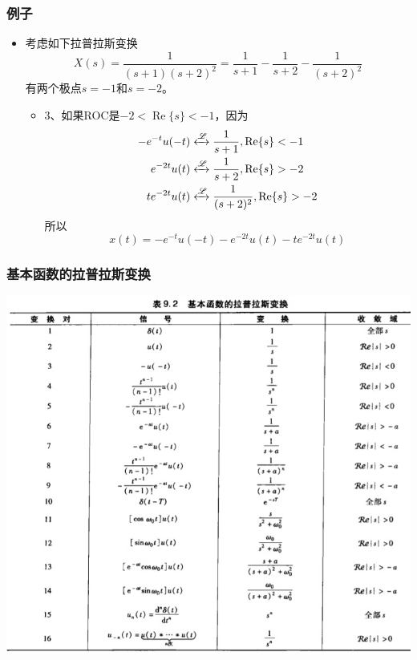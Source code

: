 \documentclass[CJKutf8,dvipsnames,table]{beamer}
\begin{document}
\begin{CJK*}{UTF8}{song}
  \begin{frame}
    \frametitle{例子}
    \begin{itemize}
    \item 考虑如下拉普拉斯变换
	\[
	   	X(s)  = \frac{1}{(s+1)(s+2)^2} = \frac{1}{s+1} - \frac{1}{s+2} - \frac{1}{(s+2)^2}
	\]
	有两个极点$s=-1$和$s=-2$。
		\begin{itemize}
		\item 3、如果ROC是$-2 < \operatorname{Re}\{s\} < -1$，因为
		\begin{align*}
			-e^{-t}u(-t) & \xleftrightarrow{\mathscr{L}} \frac{1}{s+1}, \operatorname{Re}\{s\} < -1 \\
			e^{-2t}u(t) & \xleftrightarrow{\mathscr{L}} \frac{1}{s+2}, \operatorname{Re}\{s\} > -2 \\
			te^{-2t}u(t) & \xleftrightarrow{\mathscr{L}} \frac{1}{(s+2)^2}, \operatorname{Re}\{s\} > -2 
		\end{align*}
		所以
		\[
			x(t) = -e^{-t}u(-t) - e^{-2t}u(t) - te^{-2t}u(t)
		\]
		\end{itemize}
    \end{itemize}
  \end{frame}  
    
  \begin{frame}
    \frametitle{基本函数的拉普拉斯变换}
    \begin{center}
      \includegraphics[scale=.37]{ss-c-t9-2}
    \end{center}
  \end{frame}   
            

\end{CJK*}
\end{document}
